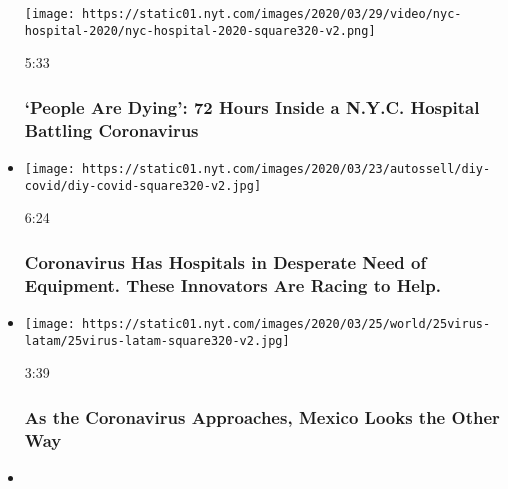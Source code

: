 \begin{itemize}
  \texttt{[image: https://static01.nyt.com/images/2020/03/29/video/nyc-hospital-2020/nyc-hospital-2020-square320-v2.png]}

  5:33

  \hypertarget{people-are-dying-72-hours-inside-a-nyc-hospital-battling-coronavirus}{%
  \subsubsection{`People Are Dying': 72 Hours Inside a N.Y.C. Hospital
  Battling
  Coronavirus}\label{people-are-dying-72-hours-inside-a-nyc-hospital-battling-coronavirus}}
\item
  \href{https://www.nytimes.com/video/us/100000007046207/coronavirus-innovative-equipment.html?action=click\&module=video-series-bar\&region=header\&pgtype=Article\&playlistId=video/coronavirus-news-update}{}

  \texttt{[image: https://static01.nyt.com/images/2020/03/23/autossell/diy-covid/diy-covid-square320-v2.jpg]}

  6:24

  \hypertarget{coronavirus-has-hospitals-in-desperate-need-of-equipment-these-innovators-are-racing-to-help}{%
  \subsubsection{Coronavirus Has Hospitals in Desperate Need of
  Equipment. These Innovators Are Racing to
  Help.}\label{coronavirus-has-hospitals-in-desperate-need-of-equipment-these-innovators-are-racing-to-help}}
\item
  \href{https://www.nytimes.com/video/world/americas/100000007049738/as-coronavirus-approaches-mexico-president-looks-other-way.html?action=click\&module=video-series-bar\&region=header\&pgtype=Article\&playlistId=video/coronavirus-news-update}{}

  \texttt{[image: https://static01.nyt.com/images/2020/03/25/world/25virus-latam/25virus-latam-square320-v2.jpg]}

  3:39

  \hypertarget{as-the-coronavirus-approaches-mexico-looks-the-other-way}{%
  \subsubsection{As the Coronavirus Approaches, Mexico Looks the Other
  Way}\label{as-the-coronavirus-approaches-mexico-looks-the-other-way}}
\item
  \href{https://www.nytimes.com/video/world/europe/100000007045579/coronavirus-italy-doctors-lombardy-hospitals-video.html?action=click\&module=video-series-bar\&region=header\&pgtype=Article\&playlistId=video/coronavirus-news-update}{}


\end{itemize}
